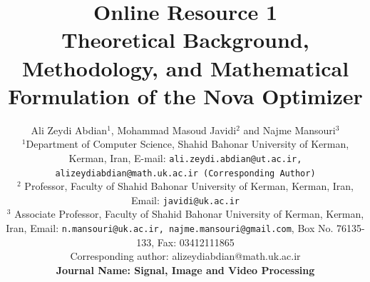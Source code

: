 \documentclass{article}
\date{}
\begin{document}
\title{\centering Online Resource 1\\ \vspace{0.5cm} Theoretical Background, Methodology, and Mathematical Formulation of the Nova Optimizer}

\author{Ali Zeydi Abdian$^1$, Mohammad Masoud Javidi$^2$ and Najme Mansouri$^3$ \\
$^1$Department of Computer Science, Shahid Bahonar University of Kerman, Kerman, Iran,   E-mail: \texttt{ali.zeydi.abdian@ut.ac.ir, alizeydiabdian@math.uk.ac.ir (Corresponding Author)} \\
$^2$ Professor, Faculty of Shahid Bahonar University of Kerman, Kerman, Iran,  Email: \texttt{javidi@uk.ac.ir} \\

$^3$ Associate Professor, Faculty of Shahid Bahonar University of Kerman, Kerman, Iran, Email: \texttt{n.mansouri@uk.ac.ir, najme.mansouri@gmail.com}, Box No. 76135-133, Fax: 03412111865\\ 
Corresponding author: alizeydiabdian@math.uk.ac.ir\\
\vspace{0.5cm}
\bf Journal Name: Signal, Image and Video Processing}


%
% 
% 
%
%
\maketitle
\end{document}
